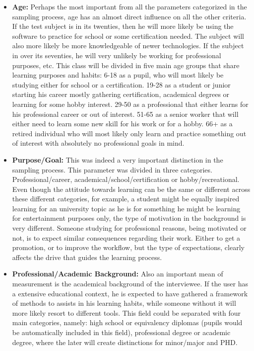 \begin{itemize}
    \item \textbf{Age: } Perhaps the most important from all the 
	parameters categorized
        in the sampling process, age has an almost direct influence 
	on all the other criteria. If the test subject is in its 
	twenties, then he will more likely 
        be using the software to practice for school or some 
	certification needed. The subject will also more likely be 
	more knowledgeable of newer technologies. If
        the subject in over its seventies, he will very 
	unlikely be working for
        professional purposes, etc. 
	This class will be divided in five main age groups that share 
	learning purposes and habits: 6-18 as a pupil, who will most likely
	be studying either for school or a certification. 19-28 as a student
	or junior starting his career mostly gathering certification, academical
	degrees or learning for some hobby interest. 29-50 as a professional
	that either learns for his professional career or out of interest.
	51-65 as a senior worker that will either need to learn some new skill
	for his work or for a hobby. 66+ as a retired individual who will 
	most likely only learn and practice something out of interest with
	absolutely no professional goals in mind.

    \item \textbf{Purpose/Goal: } This was indeed a very important 
	distinction in the sampling process. This parameter 
	was divided in three categories.
	Professional/career, academical/school/certification or 
	hobby/recreational. Even though the attitude towards learning
	can be the same or different across these different categories,
	for example, a student might be equally inspired learning 
	for an university topic as he is for something he might be
	learning for entertainment purposes only, the type of
	motivation in the background is very different. 
	Someone studying for professional reasons, being motivated or
	not, is to expect similar consequences regarding their work.
	Either to get a promotion, or to improve the workflow, but the type
	of expectations, clearly affects the drive that guides the learning 
	process.
	

    \item \textbf{Professional/Academic Background: }
	Also an important mean of measurement is the academical background 
	of the interviewee. If the user has a extensive educational context,
	he is expected to have gathered a framework of methods to assists in
	his learning habits, while someone without it will more likely resort
	to different tools.
	This field could be separated with four main categories, namely:
	high school or equivalency diplomas (pupils would be automatically
	included in this field), professional degree or academic degree, where
	the later will create distinctions for minor/major and PHD.


\end{itemize}
